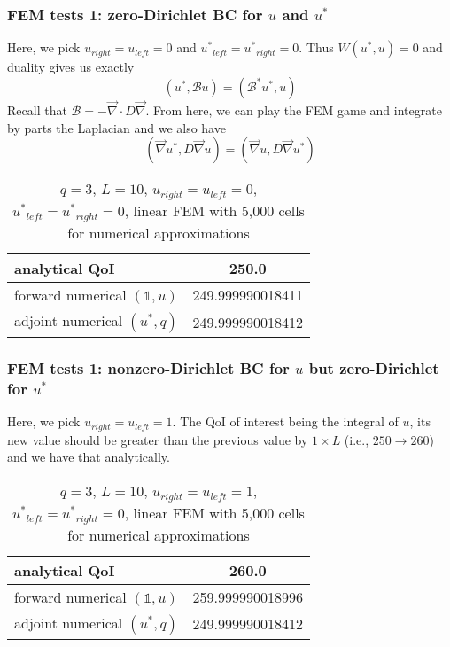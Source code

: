 \documentclass[11pt]{article}
\renewcommand{\div}{\vec{\nabla}\! \cdot \!}
\newcommand{\grad}{\vec{\nabla}}
\newcommand{\be}{\begin{equation}}
\newcommand{\ee}{\end{equation}}
\newcommand{\mc}[1]{\mathcal{#1}}
\newcommand{\us}{{u^\ast}}
\begin{document}
\subsubsection{FEM tests 1: zero-Dirichlet BC for $u$ and $\us$}
Here, we pick $u_{right}=u_{left}=0$ and $\us_{left}=\us_{right}=0$. Thus $W(\us,u)=0$ and duality gives us exactly
\be
(\us,\mc{B}u) = (\mc{B}^\ast\us,u) 
\ee
Recall that $ \mc{B} =  -\div D \grad  $. From here, we can play the FEM game and integrate by parts the Laplacian and we also have 
\be
(\grad \us, D \grad u ) = (\grad u, D \grad \us ) 
\ee

\begin{table*}[!htpb]
\begin{center}
\begin{tabular}{|l||c|}
\hline
	analytical QoI                                     & 250.0 \\ \hline
	forward numerical $ \left(\mathds{1}, u \right) $  &  249.999990018411 \\ \hline
	adjoint numerical $ \left(\us       , q \right) $  &  249.999990018412 \\ \hline
\end{tabular}
\end{center}
\caption{$q=3$, $L=10$, $u_{right}=u_{left}=0$, $\us_{left}=\us_{right}=0$, linear FEM with 5,000 cells for numerical approximations}
\end{table*}


\subsubsection{FEM tests 1: nonzero-Dirichlet BC for $u$ {\bf but} zero-Dirichlet for $\us$}
Here, we pick $u_{right}=u_{left}=1$. The QoI of interest being the integral of $u$, its new value should be greater than the previous value by $1 \times L$ (i.e., $250 \longrightarrow 260$) and we have that analytically.  

\begin{table*}[!htpb]
\begin{center}
\begin{tabular}{|l||c|}
\hline
	analytical QoI                                     & 260.0 \\ \hline
	forward numerical $ \left(\mathds{1}, u \right) $  &  259.999990018996 \\ \hline
	adjoint numerical $ \left(\us       , q \right) $  &  249.999990018412 \\ \hline
\end{tabular}
\end{center}
\caption{$q=3$, $L=10$, $u_{right}=u_{left}=1$, $\us_{left}=\us_{right}=0$, linear FEM with 5,000 cells for numerical approximations}
\end{table*}


\end{document}
